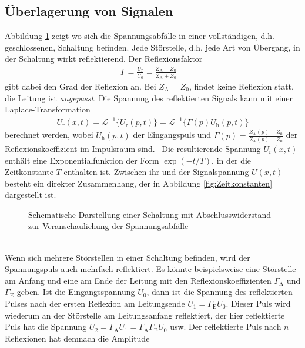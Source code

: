\subsection{Überlagerung von Signalen}
Abbildung \ref{fig:Schema} zeigt wo sich die Spannungsabfälle in einer vollständigen, d.h. geschlossenen, Schaltung befinden. Jede Störstelle, d.h. jede Art von Übergang, in der Schaltung wirkt reflektierend. Der Reflexionsfaktor
\begin{align}\label{eq:Reflexion}
	\Gamma = \frac{U_\text{r}}{U_0} = \frac{Z_\text{A}-Z_0}{Z_\text{A}+Z_0}\quad 
\end{align}
gibt dabei den Grad der Reflexion an.\footnotemark
{}
Bei $Z_\text{A} = Z_0$, findet keine Reflexion statt, die Leitung ist \textit{angepasst}.
Die Spannung des reflektierten Signals kann mit einer Laplace-Transformation
\begin{align}
	U_\text{r}(x,t) = \mathcal{L}^{-1}\{U_\text{r}(p,t)\} = \mathcal{L}^{-1}\{\Gamma(p)U_\text{h}(p,t)\}
\end{align}
berechnet werden, wobei $U_\text{h}(p,t)$ der Eingangspuls und $\Gamma(p) = \frac{Z_\text{A}(p)-Z_0}{Z_\text{A}(p)+Z_0}$ der Reflexionskoeffizient im Impulsraum sind.\footnotemark \
Die resultierende Spannung $U_\text{r}(x,t)$ enthält eine Exponentialfunktion der Form $\exp(-t/T)$, in der die Zeitkonstante $T$ enthalten ist. Zwischen ihr und der Signalspannung $U(x,t)$ besteht ein direkter Zusammenhang, der in Abbildung \ref{fig:Zeitkonstanten} dargestellt ist.
\begin{figure}[h]
	\centering
	
	\caption{Schematische Darstellung einer Schaltung mit Abschlusswiderstand zur Veranschaulichung der Spannungsabfälle}
	\label{fig:Schema}
\end{figure} \\
Wenn sich mehrere Störstellen in einer Schaltung befinden, wird der Spannungspuls auch mehrfach reflektiert. Es könnte beispielsweise eine Störstelle am Anfang und eine am Ende der Leitung mit den Reflexionskoeffizienten $\Gamma_\text{A}$ und $\Gamma_\text{E}$ geben. Ist die Eingangsspannung $U_0$, dann ist die Spannung des reflektierten Pulses nach der ersten Reflexion am Leitungsende $U_1 = \Gamma_\text{E}U_0$. Dieser Puls wird wiederum an der Störstelle am Leitungsanfang reflektiert, der hier reflektierte Puls hat die Spannung $U_2 = \Gamma_\text{A}U_1 = \Gamma_\text{A}\Gamma_\text{E}U_0$ usw. Der reflektierte Puls nach $n$ Reflexionen hat demnach die Amplitude
